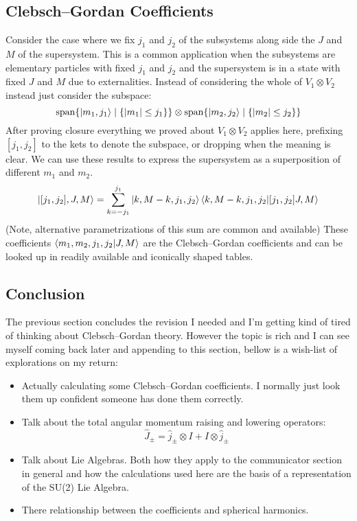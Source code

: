 \subsection{Clebsch–Gordan Coefficients}
Consider the case where we fix $j_1$ and $j_2$ of the subsystems along side the $J$ and $M$ of the supersystem.
This is a common application when the subsystems are elementary particles with fixed $j_1$ and $j_2$ and the supersystem is in a state with fixed $J$ and $M$ due to externalities. 
Instead of considering the whole of $V_1\otimes V_2$ instead just consider the subspace:
\[\operatorname{span}\{\left|m_1,j_1\right\rangle\mid\{|m_1|\leq j_1\}\}\otimes\operatorname{span}\{\left|m_2,j_2\right\rangle\mid\{|m_2|\leq j_2\}\}\]
After proving closure everything we proved about $V_1\otimes V_2$ applies here,
prefixing $[j_1,j_2]$ to the kets to denote the subspace,
or dropping when the meaning is clear.
We can use these results to express the supersystem as a superposition of different $m_1$ and $m_2$.
\[\left|[j_1,j_2],J,M\right\rangle = \sum_{k=-j_1}^{j_1}\left|k,M-k,j_1,j_2\right\rangle\left\langle k,M-k,j_1,j_2\middle|[j_1,j_2]J,M\right\rangle\]
(Note, alternative parametrizations of this sum are common and available)
These coefficients $\left\langle m_1,m_2,j_1,j_2\middle|J,M\right\rangle$ are the Clebsch–Gordan coefficients and can be looked up in readily available and iconically shaped tables.

\subsection{Conclusion}
The previous section concludes the revision I needed and I'm getting kind of tired of thinking about Clebsch–Gordan theory.
However the topic is rich and I can see myself coming back later and appending to this section,
bellow is a wish-list of explorations on my return:
\begin{itemize}
	\item Actually calculating some Clebsch–Gordan coefficients.
		I normally just look them up confident someone has done them correctly.
	\item Talk about the total angular momentum raising and lowering operators:
		\[\hat{J}_\pm = \hat{j}_\pm\otimes I + I\otimes\hat{j}_\pm\]
	\item Talk about Lie Algebras.
		Both how they apply to the communicator section in general and how the calculations used here are the basis of a representation of the SU(2) Lie Algebra.
	\item There relationship between the coefficients and spherical harmonics.
\end{itemize}

